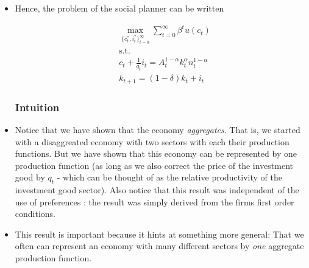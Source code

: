 \documentclass{scrartcl}
\begin{document}
\begin{itemize}
\item Hence, the problem of the social planner can be written 
		
		\begin{align}
		&\max_{\{{c_t^*,i_t^* }\}_{t=0}^{\infty}} {\sum_{t=0}^{\infty} \beta^t u(c_t)} \\
		&\text{s.t. } \nonumber \\
		&c_t+\frac{1}{q_t} i_t=A_t^{1-\alpha} k_t^{\alpha} n_t^{1-\alpha} \nonumber \\
		&k_{t+1}=(1-\delta)k_t+i_t \nonumber
		\end{align}
	
	\subsubsection*{Intuition}
	
\item Notice that we have shown that the economy \emph{aggregates}. That is, we started with a disaggreated economy with two sectors with each their production functions. But we have shown that this economy can be represented by one production function (as long as we also correct the price of the investment good by $q_t$ - which can be thought of as the relative productivity of the investment good sector). Also notice that this result was independent of the use of preferences : the result was simply derived from the firms first order conditions.

\item This result is important because it hints at something more general: That we often can represent an economy with many different sectors by \emph{one} aggregate production function.
	
\end{itemize}
\end{document}
